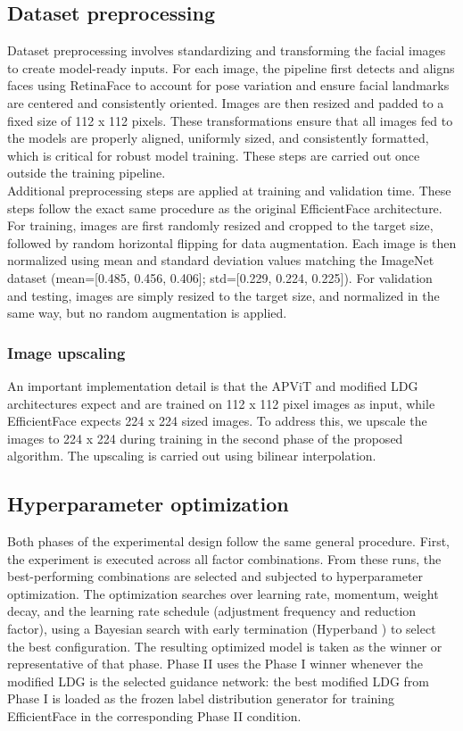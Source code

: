 \subsection{Dataset preprocessing}
Dataset preprocessing involves standardizing and transforming the facial images to create model-ready inputs. For each image, the pipeline first detects and aligns faces using RetinaFace \cite{retinaface2020} to account for pose variation and ensure facial landmarks are centered and consistently oriented. Images are then resized and padded to a fixed size of 112 x 112 pixels. These transformations ensure that all images fed to the models are properly aligned, uniformly sized, and consistently formatted, which is critical for robust model training. These steps are carried out once outside the training pipeline.\\

Additional preprocessing steps are applied at training and validation time. These steps follow the exact same procedure as the original EfficientFace architecture. For training, images are first randomly resized and cropped to the target size, followed by random horizontal flipping for data augmentation. Each image is then normalized using mean and standard deviation values matching the ImageNet dataset (mean=[0.485, 0.456, 0.406]; std=[0.229, 0.224, 0.225]). For validation and testing, images are simply resized to the target size, and normalized in the same way, but no random augmentation is applied.

\subsubsection{Image upscaling} \label{section:design-upsampling}
An important implementation detail is that the APViT and modified LDG architectures expect and are trained on 112 x 112 pixel images as input, while EfficientFace expects 224 x 224 sized images. To address this, we upscale the images to 224 x 224 during training in the second phase of the proposed algorithm. The upscaling is carried out using bilinear interpolation.

\subsection{Hyperparameter optimization}

Both phases of the experimental design follow the same general procedure. First, the experiment is executed across all factor combinations. From these runs, the best-performing combinations are selected and subjected to hyperparameter optimization. The optimization searches over learning rate, momentum, weight decay, and the learning rate schedule (adjustment frequency and reduction factor), using a Bayesian search with early termination (Hyperband \cite{hyperband2018}) to select the best configuration. The resulting optimized model is taken as the winner or representative of that phase. Phase II uses the Phase I winner whenever the modified LDG is the selected guidance network: the best modified LDG from Phase I is loaded as the frozen label distribution generator for training EfficientFace in the corresponding Phase II condition.

